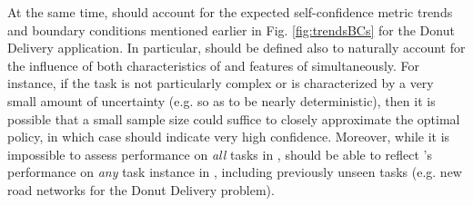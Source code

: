  
At the same time, \xQ{} should account for the expected self-confidence metric trends and boundary conditions mentioned earlier in Fig. \ref{fig:trendsBCs} for the Donut Delivery application. In particular, \xQ{} should be defined also to naturally account for the influence of both characteristics of \solve{} and features of \task{} simultaneously. For instance, if the task \task{} is not particularly complex or is characterized by a very small amount of uncertainty (e.g. so as to be nearly deterministic), then it is possible that a small sample size could suffice to closely approximate the optimal policy, in which case \xQ{} should indicate very high confidence. Moreover, while it is impossible to assess performance on \emph{all} tasks in \taskclass{}, \xQ{} should be able to reflect \solve{}'s performance on \emph{any} task instance \task{} in \taskclass{}, including previously unseen tasks (e.g. new road networks for the Donut Delivery problem). 


